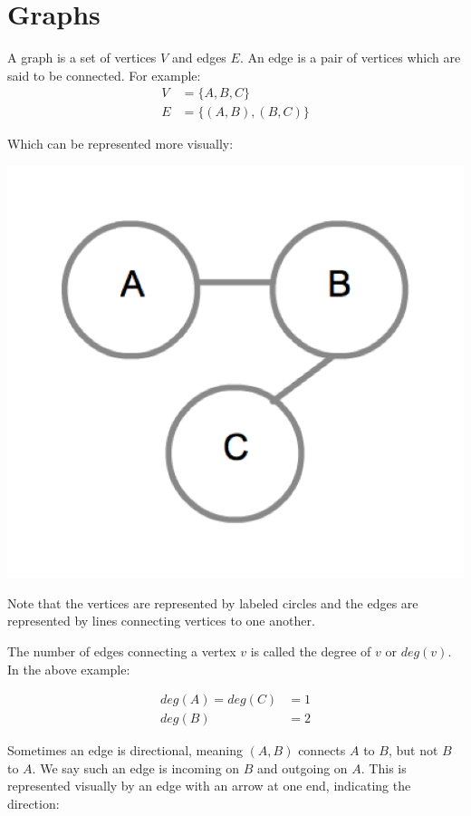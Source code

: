 \chapter{Graphs}

A graph is a set of vertices $V$ and edges $E$.  An edge is a pair of
vertices which are said to be connected.  For example:
%
\begin{align*}
V &= \{ A, B, C \} \\
E &= \{ (A, B), (B, C) \}
\end{align*}

Which can be represented more visually:

{
  \includegraphics[scale=0.2]{SimpleGraph}
  \label{fig:SimpleGraph}
}

Note that the vertices are represented by labeled circles and the
edges are represented by lines connecting vertices to one another.

The number of edges connecting a vertex $v$ is called the degree of
$v$ or $deg(v)$.  In the above example:

\begin{align*}
deg(A) = deg(C) &= 1 \\
deg(B) &= 2
\end{align*}

Sometimes an edge is directional, meaning $(A, B)$ connects $A$ to
$B$, but not $B$ to $A$.  We say such an edge is incoming on $B$ and
outgoing on $A$.  This is represented visually by an edge with an
arrow at one end, indicating the direction:

